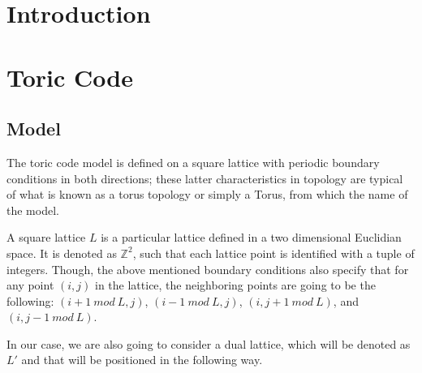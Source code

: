 \documentclass[12pt]{report}
\begin{document}
	
	\chapter{Introduction}
	
	\chapter{Toric Code}
	\section{Model}
	
	
	\begin{minipage}{1\textwidth}
		
		The toric code model is defined on a square lattice with periodic boundary conditions in both directions; these latter characteristics in topology are typical of what is known as a torus topology or simply a Torus, from which the name of the model.\newline
		
		A square lattice $L$ is a particular lattice defined in a two dimensional Euclidian space. It is denoted as $\mathbb{Z}^{2}$, such that each lattice point is identified with a tuple of integers. Though, the above mentioned boundary conditions also specify that for any point $(i, j)$ in the lattice, the neighboring points are going to be the following: $(i+1 \ mod \ L, j)$, $(i-1 \ mod \ L, j)$, $(i, j+1 \ mod \ L)$, and $(i, j-1 \ mod \ L)$.  \newline
		
		In our case, we are also going to consider a dual lattice, which will be denoted as $L'$ and that will be positioned in the following way.\newline
		
		\begin{center}
		
\end{center}
\end{minipage}
\end{document}
